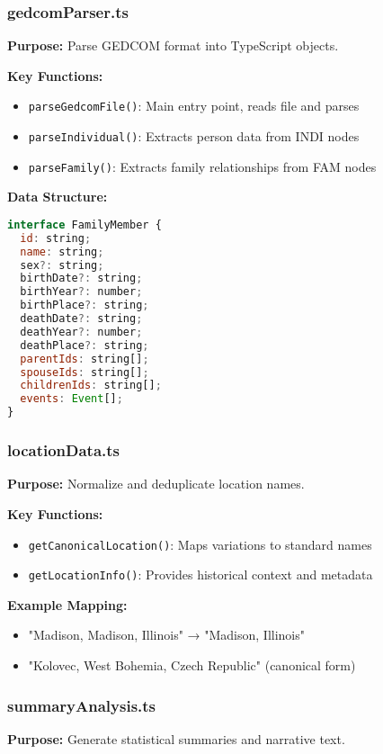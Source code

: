 \documentclass[11pt]{article}
\begin{document}
\subsubsection{gedcomParser.ts}
\textbf{Purpose:} Parse GEDCOM format into TypeScript objects.

\textbf{Key Functions:}
\begin{itemize}
    \item \texttt{parseGedcomFile()}: Main entry point, reads file and parses
    \item \texttt{parseIndividual()}: Extracts person data from INDI nodes
    \item \texttt{parseFamily()}: Extracts family relationships from FAM nodes
\end{itemize}

\textbf{Data Structure:}
\begin{lstlisting}[language=JavaScript, basicstyle=\small\ttfamily]
interface FamilyMember {
  id: string;
  name: string;
  sex?: string;
  birthDate?: string;
  birthYear?: number;
  birthPlace?: string;
  deathDate?: string;
  deathYear?: number;
  deathPlace?: string;
  parentIds: string[];
  spouseIds: string[];
  childrenIds: string[];
  events: Event[];
}
\end{lstlisting}

\subsubsection{locationData.ts}
\textbf{Purpose:} Normalize and deduplicate location names.

\textbf{Key Functions:}
\begin{itemize}
    \item \texttt{getCanonicalLocation()}: Maps variations to standard names
    \item \texttt{getLocationInfo()}: Provides historical context and metadata
\end{itemize}

\textbf{Example Mapping:}
\begin{itemize}
    \item "Madison, Madison, Illinois" → "Madison, Illinois"
    \item "Kolovec, West Bohemia, Czech Republic" (canonical form)
\end{itemize}

\subsubsection{summaryAnalysis.ts}
\textbf{Purpose:} Generate statistical summaries and narrative text.
\end{document}
